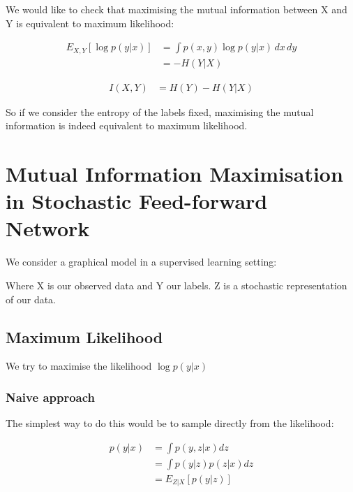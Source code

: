 \documentclass[10pt,oneside,openright]{report}
\begin{document}
We would like to check that maximising the mutual information between X and Y is equivalent to maximum likelihood:

\begin{align}
E_{X, Y}[\log p(y|x)] &= \int p(x, y)\log p(y| x)\, dx\,dy\\ 
&= - H(Y | X)\
\end{align}


\begin{align}
I(X, Y) &= H(Y) - H(Y|X)
\end{align}

So if we consider the entropy of the labels fixed, maximising the mutual information is indeed equivalent to maximum likelihood.

\section{Mutual Information Maximisation in Stochastic Feed-forward Network}

We consider a graphical model in a supervised learning setting:

\begin{figure}[H]
  \centering
\end{figure}

Where X is our observed data and Y our labels. Z is a stochastic representation of our data.

\subsection{Maximum Likelihood}

We try to maximise the likelihood $\log p(y|x)$

\subsubsection{Naive approach}

The simplest way to do this would be to sample directly from the likelihood:

\begin{align}
 p(y|x) &= \int p(y, z|x) dz \\
 &= \int p(y|z) p(z|x) dz \\
 &= E_{Z | X}[p(y|z)] 
\end{align}
\end{document}
